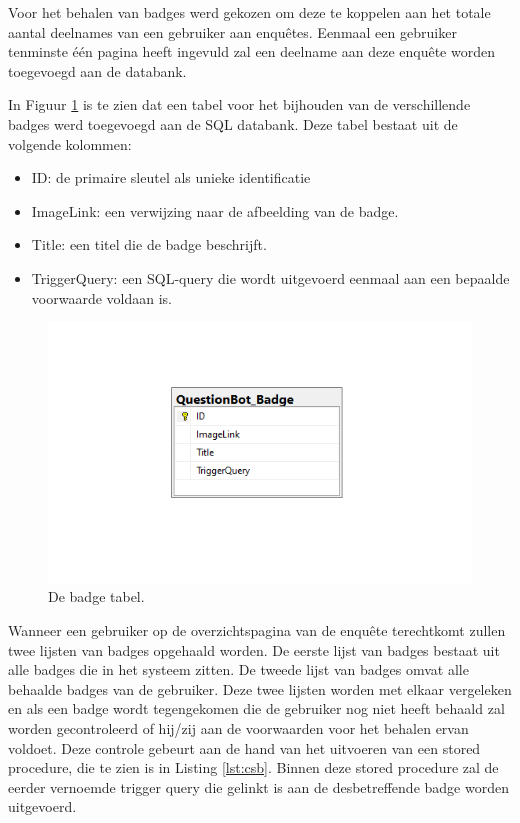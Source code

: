 Voor het behalen van badges werd gekozen om deze te koppelen aan het totale aantal deelnames van een gebruiker aan enquêtes. Eenmaal een gebruiker tenminste één pagina heeft ingevuld zal een deelname aan deze enquête worden toegevoegd aan de databank.

In Figuur \ref{fig:dbbadge} is te zien dat een tabel voor het bijhouden van de verschillende badges werd toegevoegd aan de SQL databank. Deze tabel bestaat uit de volgende kolommen:

\begin{itemize}
    \item ID: de primaire sleutel als unieke identificatie
    \item ImageLink: een verwijzing naar de afbeelding van de badge.
    \item Title: een titel die de badge beschrijft.
    \item TriggerQuery: een SQL-query die wordt uitgevoerd eenmaal aan een bepaalde voorwaarde voldaan is.
\end{itemize}

\begin{figure}
    \includegraphics[width=\linewidth]{DBBadge2.png}
    \caption{De badge tabel.}
    \label{fig:dbbadge}
\end{figure}

Wanneer een gebruiker op de overzichtspagina van de enquête terechtkomt zullen twee lijsten van badges opgehaald worden. De eerste lijst van badges bestaat uit alle badges die in het systeem zitten. De tweede lijst van badges omvat alle behaalde badges van de gebruiker. Deze twee lijsten worden met elkaar vergeleken en als een badge wordt tegengekomen die de gebruiker nog niet heeft behaald zal worden gecontroleerd of hij/zij aan de voorwaarden voor het behalen ervan voldoet. Deze controle gebeurt aan de hand van het uitvoeren van een stored procedure, die te zien is in Listing \ref{lst:csb}. Binnen deze stored procedure zal de eerder vernoemde trigger query die gelinkt is aan de desbetreffende badge worden uitgevoerd.

